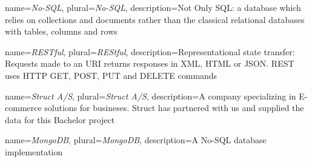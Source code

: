 
{
	name=\textit{No-SQL},
	plural=\textit{No-SQL},
	description={Not Only SQL: a database which relies on collections and documents rather than the classical relational databases with tables, columns and rows}
}

{
	name=\textit{RESTful},
	plural=\textit{REStful},
	description={Representational state transfer: Requests made to an URI returns responses in XML, HTML or JSON. REST uses HTTP GET, POST, PUT and DELETE commands}
}

{
	name=\textit{Struct A/S},
	plural=\textit{Struct A/S},
	description={A company specializing in E-commerce solutions for busineses. Struct has partnered with us and supplied the data for this Bachelor project}
}

{
	name=\textit{MongoDB},
	plural=\textit{MongoDB},
	description={A No-SQL database implementation}
}











